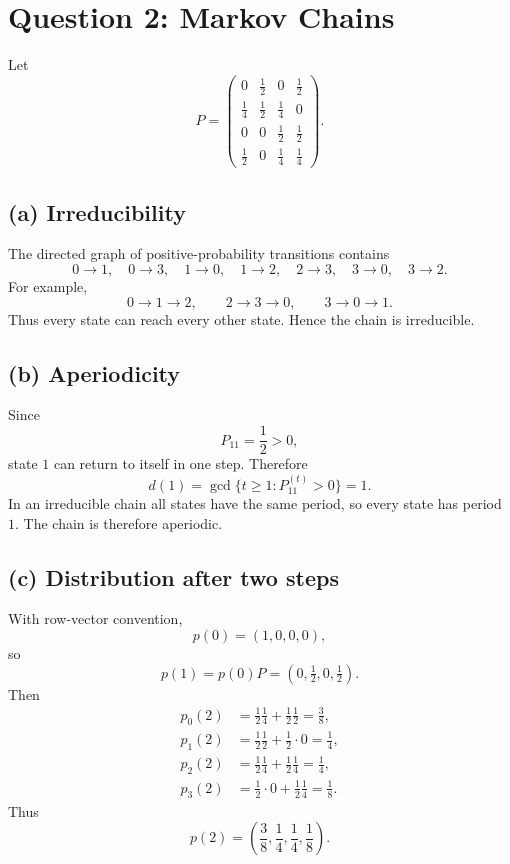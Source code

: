 \documentclass[11pt,a4paper]{article}
\begin{document}
\newpage
\section*{Question 2: Markov Chains}

Let
\[
P=
\begin{pmatrix}
0&\tfrac12&0&\tfrac12\\
\tfrac14&\tfrac12&\tfrac14&0\\
0&0&\tfrac12&\tfrac12\\
\tfrac12&0&\tfrac14&\tfrac14
\end{pmatrix}.
\]

\subsection*{(a) Irreducibility}
The directed graph of positive-probability transitions contains
\[
0\to1,\quad 0\to3,\quad 1\to0,\quad 1\to2,
\quad 2\to3,\quad 3\to0,\quad 3\to2.
\]
For example,
\[
0\to1\to2,\qquad 2\to3\to0,\qquad 3\to0\to1.
\]
Thus every state can reach every other state. Hence the chain is irreducible.

\subsection*{(b) Aperiodicity}
Since
\[
P_{11}=\frac12>0,
\]
state $1$ can return to itself in one step. Therefore
\[
d(1)=\gcd\{t\ge1:P^{(t)}_{11}>0\}=1.
\]
In an irreducible chain all states have the same period, so every state has period $1$.
The chain is therefore aperiodic.

\subsection*{(c) Distribution after two steps}
With row-vector convention,
\[
p(0)=(1,0,0,0),
\]
so
\[
p(1)=p(0)P=(0,\tfrac12,0,\tfrac12).
\]
Then
\begin{align*}
p_0(2)&=\frac12\frac14+\frac12\frac12=\frac38,\\
p_1(2)&=\frac12\frac12+\frac12\cdot0=\frac14,\\
p_2(2)&=\frac12\frac14+\frac12\frac14=\frac14,\\
p_3(2)&=\frac12\cdot0+\frac12\frac14=\frac18.
\end{align*}
Thus
\[
\boxed{p(2)=\left(\frac38,\frac14,\frac14,\frac18\right)}.
\]
\end{document}
